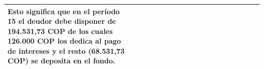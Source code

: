 \begin{center}
\begin{longtable}[H]{|p{0.5\linewidth}|p{0.5\linewidth}|}
{				Esto significa que en el período 15 el deudor debe disponer de 194.531,73 COP de los cuales 126.000 COP los dedica al pago de intereses y el resto (68.531,73 COP) se deposita en el fondo.
				
			}  \\ \hline
			
			
		\end{longtable}
	\end{center}
